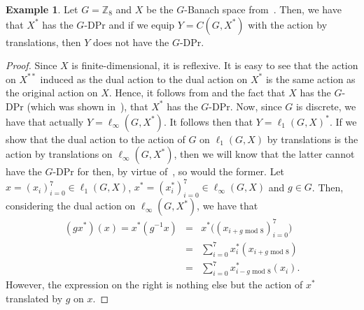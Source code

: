 \documentclass[a4paper,12pt]{amsart}
\theoremstyle{definition}
\theoremstyle{definition}
\newtheorem{example}[theorem]{Example}
\theoremstyle{remark}
\numberwithin{equation}{section}
\newcommand{\Z}{\mathbb{Z}}
\newcommand{\<}{\langle}
\renewcommand{\>}{\rangle}
\begin{document}
	\begin{example} \label{C(K,X)-action}
		Let $G = \Z_8$ and $X$ be the $G$-Banach space from~. Then, we have that $X^*$ has the $G$-DPr and if we equip $Y = C(G, X^*)$ with the action by translations, then $Y$ does not have the $G$-DPr. 
	\end{example}
	\begin{proof}
		Since $X$ is finite-dimensional, it is reflexive. It is easy to see that the action on $X^{**}$ induced as the dual action to the dual action on $X^*$ is the same action as the original action on $X$. Hence, it follows from  and the fact that $X$ has the $G$-DPr (which was shown in~), that $X^*$ has the $G$-DPr.
		Now, since $G$ is discrete, we have that actually $Y = \ell_\infty(G, X^*)$. It follows then that $Y = \ell_1(G, X)^*$. If we show that the dual action to the action of $G$ on $\ell_1(G, X)$ by translations is the action by translations on $\ell_\infty(G, X^*)$, then we will know that the latter cannot have the $G$-DPr for then, by virtue of~, so would the former. Let $x = (x_i)_{i=0}^7 \in \ell_1(G, X)$, $x^* = (x^*_i)_{i=0}^7 \in \ell_\infty(G, X)$ and $g \in G$. Then, considering the dual action on $\ell_\infty(G, X^*)$, we have that 
		\begin{eqnarray*}
			(gx^*)(x) = x^*(g^{-1}x) &=& x^*\big( (x_{i+g \textrm{ mod } 8})_{i=0}^7 \big) \\
			&=& \sum_{i=0}^7 x^*_i (x_{i+g \textrm{ mod } 8}) \\
			&=& \sum_{i=0}^7 x^*_{i-g \textrm{ mod } 8} (x_i).
		\end{eqnarray*}
		However, the expression on the right is nothing else but the action of $x^*$ translated by $g$ on $x$.
	\end{proof}
	
\end{document}
